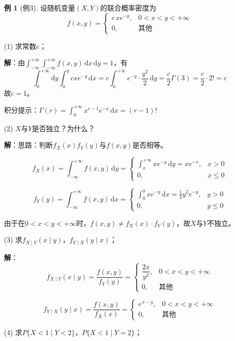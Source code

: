 \documentclass[11pt,a4paper]{report}
\theoremstyle{definition}
\newtheorem{example}{例}[chapter]
\theoremstyle{plain}
\begin{document}
\begin{example}[例3]
设随机变量\((X,Y)\)的联合概率密度为
\[
f(x,y)=\begin{cases}
c\,x e^{-y}, & 0<x<y<+\infty \\[6pt]
0, & \text{其他}
\end{cases}
\]

(1) 求常数\(c\)；

\textbf{解}：由\(\displaystyle\int_{-\infty}^{+\infty}\int_{-\infty}^{+\infty}f(x,y)\,\mathrm{d}x\,\mathrm{d}y=1\)，有
\[
\int_0^{+\infty}\mathrm{d}y\int_0^{y}c x e^{-y}\,\mathrm{d}x=c\int_0^{+\infty}e^{-y}\cdot\frac{y^2}{2}\,\mathrm{d}y=\frac{c}{2}\Gamma(3)=\frac{c}{2}\cdot 2!=c
\]
故\(c=1\)。

积分提示：\(\Gamma(r)=\displaystyle\int_0^{+\infty}x^{r-1}e^{-x}\,\mathrm{d}x=(r-1)!\)

(2) \(X\)与\(Y\)是否独立？为什么？

\textbf{解}：思路：判断\(f_X(x)f_Y(y)\)与\(f(x,y)\)是否相等。

\[
f_X(x)=\int_{-\infty}^{+\infty}f(x,y)\,\mathrm{d}y=\begin{cases}
\displaystyle\int_x^{+\infty}x e^{-y}\,\mathrm{d}y=x e^{-x}, & x>0 \\[10pt]
0, & x\leq 0
\end{cases}
\]

\[
f_Y(y)=\int_{-\infty}^{+\infty}f(x,y)\,\mathrm{d}x=\begin{cases}
\displaystyle\int_0^{y}x e^{-y}\,\mathrm{d}x=\frac{1}{2}y^2 e^{-y}, & y>0 \\[10pt]
0, & y\leq 0
\end{cases}
\]

由于在\(0<x<y<+\infty\)时，\(f(x,y)\neq f_X(x)\cdot f_Y(y)\)，故\(X\)与\(Y\)不独立。

(3) 求\(f_{X\mid Y}(x\mid y)\)，\(f_{Y\mid X}(y\mid x)\)；

\textbf{解}：
\[
f_{X\mid Y}(x\mid y)=\frac{f(x,y)}{f_Y(y)}=\begin{cases}
\dfrac{2x}{y^2}, & 0<x<y<+\infty \\[8pt]
0, & \text{其他}
\end{cases}
\]

\[
f_{Y\mid X}(y\mid x)=\frac{f(x,y)}{f_X(x)}=\begin{cases}
e^{x-y}, & 0<x<y<+\infty \\[6pt]
0, & \text{其他}
\end{cases}
\]

(4) 求\(P\{X<1\mid Y<2\}\)，\(P\{X<1\mid Y=2\}\)；


\end{example}
\end{document}
